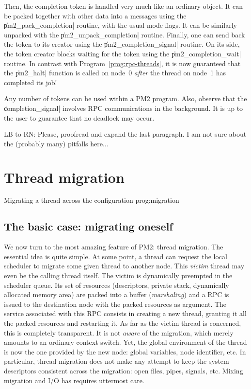 Then, the completion token is handled very much like an ordinary
object. It can be packed together with other data into a messages
using the \|pm2_pack_completion| routine, with the usual mode flags.
It can be similarly unpacked with the \|pm2_unpack_completion|
routine.  Finally, one can send back the token to its creator using
the \|pm2_completion_signal| routine. On its side, the token creator
blocks waiting for the token using the \|pm2_completion_wait|
routine. In contrast with Program~\ref{prog:rpc-threads}, it is now
guaranteed that the \|pm2_halt| function is called on node~0
\emph{after} the thread on node~1 has completed its job!

Any number of tokens can be used within a PM2 program. Also, observe
that the \|completion_signal| involves RPC communications in the
background. It is up to the user to guarantee that no deadlock may
occur.

\begin{note}
  LB to RN: Please, proofread and expand the last paragraph. I am not
  sure about the (probably many) pitfalls here...
\end{note}

\section{Thread migration}

 {Migrating a thread across the
  configuration} {prog:migration}

\subsection{The basic case: migrating oneself}
\label{sec:self-migration}

We now turn to the most amazing feature of PM2: thread migration. The
essential idea is quite simple. At some point, a thread can request
the local scheduler to migrate some given thread to another node. This
\emph{victim} thread may even be the calling thread itself. The victim
is dynamically preempted in the scheduler queue. Its set of resources
(descriptors, private stack, dynamically allocated memory area) are
packed into a buffer (\emph{marshaling}) and a RPC is issued to the
destination node with the packed resources as argument.  The service
associated with this RPC consists in creating a new thread, granting
it all the packed resources and restarting it.  As far as the victim
thread is concerned, this is completely transparent.  It is not
\emph{aware} of the migration, which merely amounts to an ordinary
context switch.  Yet, the global environment of the thread is now the
one provided by the new node: global variables, node identifier, etc.
In particular, thread migration does not make any attempt to keep the
system descriptors consistent across the migration: open files, pipes,
signals, etc.  Mixing migration and I/O has requires uttermost care.

